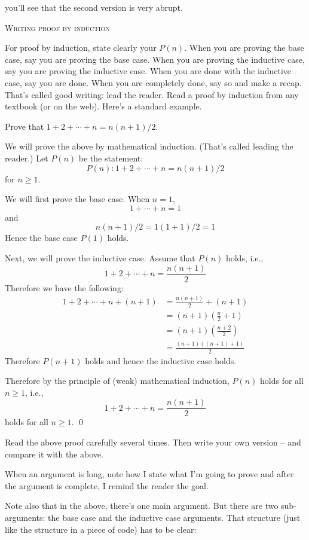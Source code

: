 you'll see that the second version is very abrupt.

\newpage
\textsc{Writing proof by induction}

For proof by induction, state clearly your $P(n)$.
When you are proving the base case, say you are proving the base case.
When you are proving the inductive case, say you are proving the inductive
case. When you are done with the inductive case, say you are done.
When you are completely done, say so and make a recap. 
That's called good writing: lead the reader.
Read a proof by induction from any textbook (or on the web).
Here's a standard example.

Prove that $1 + 2 + \cdots + n = n(n+1)/2$.

We will prove the above by mathematical induction.
(That's called leading the reader.)
Let $P(n)$ be the statement:
\[
P(n): 1 + 2 + \cdots + n = n(n+1)/2
\]
for $n \geq 1$.

We will first prove the base case. When $n = 1$,
\[
1 + \cdots + n = 1
\]
and
\[
n(n+1)/2 = 1(1+1)/2 = 1
\]
Hence the base case $P(1)$ holds.

Next, we will prove the inductive case.
Assume that $P(n)$ holds, i.e.,
\[
1 + 2 + \cdots + n = \frac{n(n+1)}{2}
\]
Therefore we have the following:
\begin{align*}
1 + 2 + \cdots + n + (n+1) &= \frac{n(n+1)}{2} + (n + 1)           \\
                           &= (n+1) \left( \frac{n}{2} + 1 \right) \\
                           &= (n+1) \left( \frac{n + 2}{2} \right) \\
                           &= \frac{(n+1)((n + 1) + 1)}{2} 
\end{align*}
Therefore $P(n+1)$ holds and hence the inductive case holds.

Therefore by the principle of (weak) mathematical induction,
$P(n)$ holds for all $n \geq 1$, i.e.,
\[
1 + 2 + \cdots + n = \frac{n(n+1)}{2}
\]
holds for all $n \geq 1$.
\qed

Read the above proof carefully several times.
Then write your own version -- and compare it with the above.

When an argument is long, note how I state what I'm going to prove
and after the argument is complete, I 
remind the reader the goal.

Note also that in the above, there's one main argument.
But there are two sub-arguments: the base case and the inductive case
arguments.
That structure (just like the structure in a piece of code) has to be clear:    

